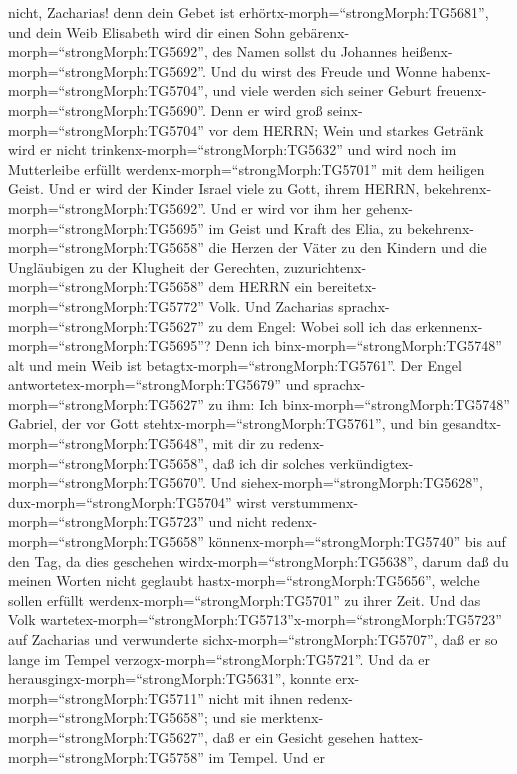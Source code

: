 nicht, Zacharias! denn dein Gebet ist
erhörtx-morph=``strongMorph:TG5681'', und dein Weib Elisabeth wird dir
einen Sohn gebärenx-morph=``strongMorph:TG5692'', des Namen sollst du
Johannes heißenx-morph=``strongMorph:TG5692''.  Und du
wirst des Freude und Wonne habenx-morph=``strongMorph:TG5704'', und
viele werden sich seiner Geburt freuenx-morph=``strongMorph:TG5690''.
 Denn er wird groß seinx-morph=``strongMorph:TG5704'' vor
dem HERRN; Wein und starkes Getränk wird er nicht
trinkenx-morph=``strongMorph:TG5632'' und wird noch im Mutterleibe
erfüllt werdenx-morph=``strongMorph:TG5701'' mit dem heiligen Geist.
 Und er wird der Kinder Israel viele zu Gott, ihrem HERRN,
bekehrenx-morph=``strongMorph:TG5692''.  Und er wird vor
ihm her gehenx-morph=``strongMorph:TG5695'' im Geist und Kraft des Elia,
zu bekehrenx-morph=``strongMorph:TG5658'' die Herzen der Väter zu den
Kindern und die Ungläubigen zu der Klugheit der Gerechten,
zuzurichtenx-morph=``strongMorph:TG5658'' dem HERRN ein
bereitetx-morph=``strongMorph:TG5772'' Volk.  Und Zacharias
sprachx-morph=``strongMorph:TG5627'' zu dem Engel: Wobei soll ich das
erkennenx-morph=``strongMorph:TG5695''? Denn ich
binx-morph=``strongMorph:TG5748'' alt und mein Weib ist
betagtx-morph=``strongMorph:TG5761''.  Der Engel
antwortetex-morph=``strongMorph:TG5679'' und
sprachx-morph=``strongMorph:TG5627'' zu ihm: Ich
binx-morph=``strongMorph:TG5748'' Gabriel, der vor Gott
stehtx-morph=``strongMorph:TG5761'', und bin
gesandtx-morph=``strongMorph:TG5648'', mit dir zu
redenx-morph=``strongMorph:TG5658'', daß ich dir solches
verkündigtex-morph=``strongMorph:TG5670''.  Und
siehex-morph=``strongMorph:TG5628'', dux-morph=``strongMorph:TG5704''
wirst verstummenx-morph=``strongMorph:TG5723'' und nicht
redenx-morph=``strongMorph:TG5658'' könnenx-morph=``strongMorph:TG5740''
bis auf den Tag, da dies geschehen wirdx-morph=``strongMorph:TG5638'',
darum daß du meinen Worten nicht geglaubt
hastx-morph=``strongMorph:TG5656'', welche sollen erfüllt
werdenx-morph=``strongMorph:TG5701'' zu ihrer Zeit.  Und
das Volk
wartetex-morph=``strongMorph:TG5713''x-morph=``strongMorph:TG5723'' auf
Zacharias und verwunderte sichx-morph=``strongMorph:TG5707'', daß er so
lange im Tempel verzogx-morph=``strongMorph:TG5721''.  Und
da er herausgingx-morph=``strongMorph:TG5631'', konnte
erx-morph=``strongMorph:TG5711'' nicht mit ihnen
redenx-morph=``strongMorph:TG5658''; und sie
merktenx-morph=``strongMorph:TG5627'', daß er ein Gesicht gesehen
hattex-morph=``strongMorph:TG5758'' im Tempel. Und er
